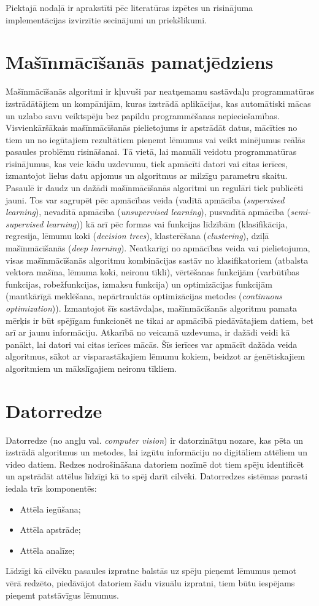 Piektajā nodaļā ir aprakstīti pēc literatūras izpētes un risinājuma implementācijas izvirzītie secinājumi un priekšlikumi.
\newpage
\section{Mašīnmācīšanās pamatjēdziens}
Mašīnmācīšanās algoritmi ir kļuvuši par neatņemamu sastāvdaļu programmatūras izstrādātājiem un kompānijām, kuras izstrādā aplikācijas, kas automātiski mācas un uzlabo savu veiktspēju bez papildu programmēšanas nepieciešamības. Visvienkāršākais mašīnmācīšanās pielietojums ir apstrādāt datus, mācīties no tiem un no iegūtajiem rezultātiem pieņemt lēmumus vai veikt minējumus reālās pasaules problēmu risināšanai. Tā vietā, lai manuāli veidotu programmatūras risinājumus, kas veic kādu uzdevumu, tiek apmācīti datori vai citas ierīces, izmantojot lielus datu apjomus un algoritmus ar milzīgu parametru skaitu. 
Pasaulē ir daudz un dažādi mašīnmācīšanās algoritmi un regulāri tiek publicēti jauni. Tos var sagrupēt pēc apmācības veida (vadītā apmācība (\textit{supervised learning}), nevadītā apmācība (\textit{unsupervised learning}), pusvadītā apmācība (\textit{semi-supervised learning})) kā arī pēc formas vai funkcijas līdzībām (klasifikācija, regresija, lēmumu koki (\textit{decision trees}), klasterēšana (\textit{clustering}), dziļā mašīnmācīšanās (\textit{deep learning}). Neatkarīgi no apmācības veida vai pielietojuma, visas mašīnmācīšanās algoritmu kombinācijas sastāv no klasifikatoriem (atbalsta vektora mašīna, lēmuma koki, neironu tīkli), vērtēšanas funkcijām (varbūtības funkcijas, robežfunkcijas, izmaksu funkcija) un optimizācijas funkcijām (mantkārīgā meklēšana, nepārtrauktās optimizācijas metodes (\textit{continuous optimization})). Izmantojot šīs sastāvdaļas, mašīnmācīšanās algoritmu pamata mērķis ir būt spējīgam funkcionēt ne tikai ar apmācībā piedāvātajiem datiem, bet arī ar jaunu informāciju. Atkarībā no veicamā uzdevuma, ir dažādi veidi kā panākt, lai datori vai citas ierīces mācās. Šīs ierīces var apmācīt dažāda veida algoritmus, sākot ar visparastākajiem lēmumu kokiem, beidzot ar ģenētiskajiem algoritmiem un mākslīgajiem neironu tīkliem. 


\section{Datorredze}
Datorredze (no angļu val. \textit{computer vision}) ir datorzinātņu nozare, kas pēta un izstrādā algoritmus un metodes, lai izgūtu informāciju no  digitāliem attēliem un video datiem. Redzes nodrošināšana datoriem nozīmē dot tiem spēju identificēt un apstrādāt attēlus līdzīgi kā to spēj darīt cilvēki. Datorredzes sistēmas parasti iedala trīs komponentēs:
\begin{itemize}
	\item Attēla iegūšana;
	\item Attēla apstrāde;
	\item Attēla analīze;
\end{itemize}
Līdzīgi kā cilvēku pasaules izpratne balstās uz spēju pieņemt lēmumus ņemot vērā redzēto, piedāvājot datoriem šādu vizuālu izpratni, tiem būtu iespējams pieņemt patstāvīgus lēmumus.

